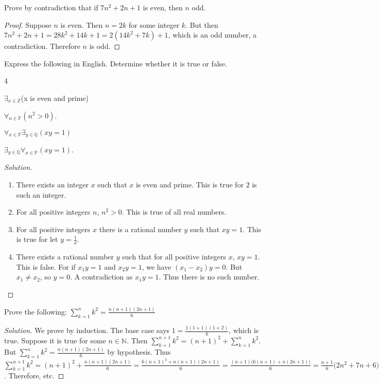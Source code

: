 \documentclass[../main.tex]{subfiles}
\begin{document}
\begin{problem}
Prove by contradiction that if $7n^2+2n + 1$ is even, then $n$ odd.
\end{problem}
\begin{proof}
Suppose $n$ is even. Then $n=2k$ for some integer $k$. But then $7n^2+2n+1 = 28k^2+14k+1 = 2(14k^2+7k)+1$, which is an odd number, a contradiction. Therefore $n$ is odd.
\end{proof}

\begin{problem}
Express the following in English. Determine whether it is true or false.
\begin{enumerate}
\begin{multicols}{4}
\item $\exists_{x\in \mathbb{Z}}$\footnotesize{(x is even and prime)}
\item $\forall_{n\in \mathbb{P}}(n^2>0)$.
\item $\forall_{x\in \mathbb{P}}\exists_{y\in \mathbb{Q}}(xy=1)$
\item $\exists_{y\in \mathbb{Q}}\forall_{x\in \mathbb{P}}(xy=1)$.
\end{multicols}
\end{enumerate}
\end{problem}
\begin{proof}[Solution]
\
\begin{enumerate}
\item There exists an integer $x$ such that $x$ is even and prime. This is true for $2$ is such an integer.
\item For all positive integers $n$, $n^2>0$. This is true of all real numbers.
\item For all positive integers $x$ there is a rational number $y$ such that $xy=1$. This is true for let $y=\frac{1}{x}$.
\item There exists a rational number $y$ such that for all positive integers $x$, $xy=1$. This is false. For if $x_1 y = 1$ and $x_2 y = 1$, we have $(x_1-x_2)y = 0$. But $x_1 \ne x_2$, so $y=0$. A contradiction as $x_1y=1$. Thus there is no such number.
\end{enumerate}
\end{proof}

\begin{problem}
Prove the following: $\sum_{k=1}^{n} k^2 = \frac{n(n+1)(2n+1)}{6}$
\end{problem}
\begin{proof}[Solution]
We prove by induction. The base case says $1 = \frac{1(1+1)(1+2)}{6}$, which is true. Suppose it is true for some $n\in \mathbb{N}$. Then $\sum_{k=1}^{n+1}k^2 = (n+1)^2+\sum_{k=1}^{n} k^2$. But $\sum_{k=1}^{n} k^2 = \frac{n(n+1)(2n+1)}{6}$ by hypothesis. Thus $\sum_{k=1}^{n+1} k^2 = (n+1)^2+\frac{n(n+1)(2n+1)}{6} = \frac{6(n+1)^2+n(n+1)(2n+1)}{6} = \frac{(n+1)\big(6(n+1)+n(2n+1)\big)}{6} = \frac{n+1}{6}\big(2n^2+7n+6\big) = \frac{(n+1)(n+2)(2n+3)}{6} = \frac{(n+1)\big((n+1)+1\big)\big(2(n+1)+1\big)}{6}$. Therefore, etc.
\end{proof}
\end{document}
